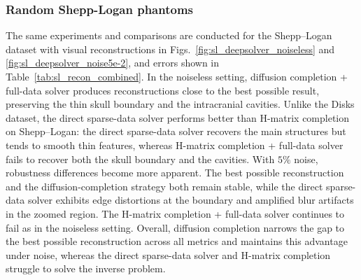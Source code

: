 \documentclass{article}
\begin{document}
\subsubsection{Random Shepp-Logan phantoms}\label{sec:SL}
The same experiments and comparisons are conducted for the Shepp--Logan dataset with visual reconstructions in Figs.~\ref{fig:sl_deepsolver_noiseless} and \ref{fig:sl_deepsolver_noise5e-2}, and errors shown in Table~\ref{tab:sl_recon_combined}. In the noiseless setting, diffusion completion + full-data solver produces reconstructions close to the best possible result, preserving the thin skull boundary and the intracranial cavities. Unlike the Disks dataset, the {direct sparse-data solver} performs better than {H-matrix completion} on Shepp--Logan: the {direct sparse-data solver} recovers the main structures but tends to smooth thin features, whereas {H-matrix completion + full-data solver} fails to recover both the skull boundary and the cavities. With \(5\%\) noise, robustness differences become more apparent. The {best possible reconstruction} and the {diffusion-completion} strategy both remain stable, while the {direct sparse-data solver} exhibits edge distortions at the boundary and amplified blur artifacts in the zoomed region. The {H-matrix completion + full-data solver} continues to fail as in the noiseless setting. Overall, diffusion completion narrows the gap to the best possible reconstruction across all metrics and maintains this advantage under noise, whereas the direct sparse-data solver and H-matrix completion struggle to solve the inverse problem.
\end{document}
